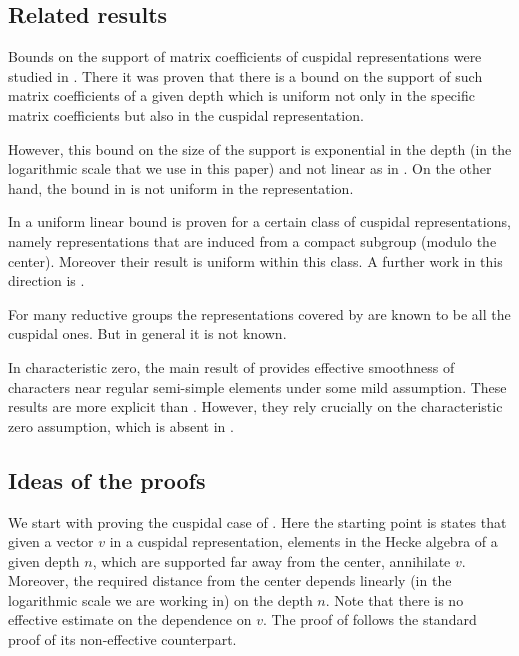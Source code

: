 \documentclass[12pt,a4paper]{amsart}%
\newcommand{\Rami}[1]{{{#1}}}
\newcommand{\RamiA}[1]{{{#1}}}
\newcommand{\DimaA}[1]{{{#1}}}
\begin{document}
\subsection{Related results}
Bounds on the support of matrix coefficients of cuspidal representations were studied in \cite{Ber_tam}. There it was proven that there is a bound on the support of such matrix coefficients of a given depth which is uniform not only in the specific matrix coefficients but also in the cuspidal representation.

However, this bound on the size of the support is exponential in the depth (in the logarithmic scale that we use in this paper) and not linear as in . On the other hand, the bound in  is not uniform in the \DimaA{representation.}

In \cite[Theorem 3]{FL_bnd} a uniform linear bound is proven for a certain class of cuspidal representations, namely representations that are induced from a compact subgroup (modulo the center). Moreover their result is uniform within this class. {A further work in this direction is \cite{Lap}}.

For many reductive groups the representations covered by \cite[Theorem 3]{FL_bnd} are known to be all the cuspidal ones. But in general it is not known.

\Rami{In characteristic zero, the main result of \cite{Kor} provides effective
smoothness of characters near regular semi-simple elements under some mild assumption. These results are more explicit than  \Cref{thm:smooth}. However, they rely crucially on the characteristic zero assumption, which is absent in \Cref{thm:smooth}.
}

\subsection{Ideas of the proofs}
We start with proving the cuspidal case of . Here the starting point is \Cref{prop:van.vec}\Rami{. It} states that given a vector $v$ in a cuspidal representation, elements in the Hecke algebra of a given depth $n$, which are supported far away from the center, annihilate $v$. Moreover, the required distance from the center depends linearly (in the logarithmic scale we are working in) on the depth $n$. Note that there is no effective estimate on the dependence on $v$. \RamiA{The proof of  follows the standard proof of its non-effective counterpart.}
\end{document}

